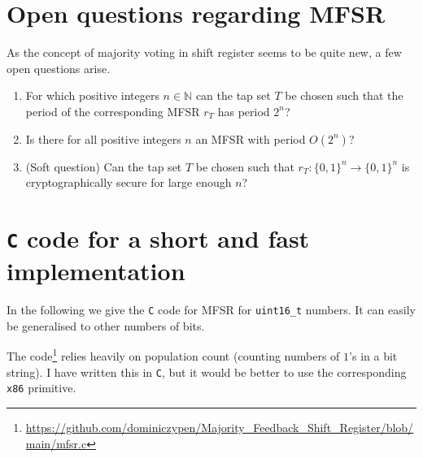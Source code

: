 \documentclass[12pt, a4paper]{amsart}
\begin{document}
\section{Open questions regarding MFSR}
As the concept of majority voting in shift register seems 
to be quite new, a few open questions arise. 
\begin{enumerate}
\item For which positive integers $n\in\mathbb{N}$ can the 
tap set $T$ be chosen such that the period
of the corresponding MFSR $r_T$
	has period $2^n$?
\item Is there for all positive integers $n$ an 
	MFSR with period $O(2^n)$?
\item (Soft question) Can the tap set $T$ be chosen such that
	$r_T:\{0,1\}^n\to\{0,1\}^n$ is cryptographically secure
		for large enough $n$?
\end{enumerate}
\section{{\tt C} code for a short and fast implementation}
In the following we give the {\tt C} code for MFSR for {\tt uint16\_t} 
numbers. It can easily be generalised to other numbers of bits.

The code\footnote{\url{https://github.com/dominiczypen/Majority_Feedback_Shift_Register/blob/main/mfsr.c}} relies heavily on population count (counting numbers of $1$'s
in a bit string). I have written this in {\tt C}, but it would be
better to use the corresponding {\tt x86} primitive. 
\end{document}
